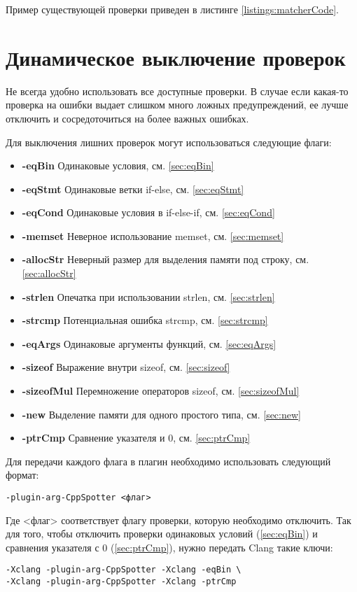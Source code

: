 Пример существующей проверки приведен в листинге \ref{listings:matcherCode}.

\section{Динамическое выключение проверок}
Не всегда удобно использовать все доступные проверки. В случае если какая-то проверка на ошибки
выдает слишком много ложных предупреждений, ее лучше отключить и сосредоточиться на более важных
ошибках. 

Для выключения лишних проверок могут использоваться следующие флаги:
\begin{itemize}
	\item \textbf{-eqBin}	Одинаковые условия, см. \ref{sec:eqBin}
	\item \textbf{-eqStmt}	Одинаковые ветки if-else, см. \ref{sec:eqStmt}
	\item \textbf{-eqCond}	Одинаковые условия в if-else-if, см. \ref{sec:eqCond}
	\item \textbf{-memset}	Неверное использование memset, см. \ref{sec:memset}
	\item \textbf{-allocStr}	Неверный размер для выделения памяти под строку, см. \ref{sec:allocStr}
	\item \textbf{-strlen}	Опечатка при использовании strlen, см. \ref{sec:strlen}
	\item \textbf{-strcmp}	Потенциальная ошибка strcmp, см. \ref{sec:strcmp}
	\item \textbf{-eqArgs}	Одинаковые аргументы функций, см. \ref{sec:eqArgs}
	\item \textbf{-sizeof}	Выражение внутри sizeof, см. \ref{sec:sizeof}
	\item \textbf{-sizeofMul}	Перемножение операторов sizeof, см. \ref{sec:sizeofMul}
	\item \textbf{-new}		Выделение памяти для одного простого типа, см. \ref{sec:new}
	\item \textbf{-ptrCmp}	Сравнение указателя и 0, см. \ref{sec:ptrCmp}
\end{itemize}

Для передачи каждого флага в плагин необходимо использовать следующий формат:
\begin{lstlisting}
-plugin-arg-CppSpotter <флаг> 
\end{lstlisting}
Где <флаг> соответствует флагу проверки, которую необходимо отключить.
Так для того, чтобы отключить проверки одинаковых условий (\ref{sec:eqBin}) и сравнения указателя с 0 (\ref{sec:ptrCmp}),
нужно передать Clang такие ключи:
\begin{lstlisting}
-Xclang -plugin-arg-CppSpotter -Xclang -eqBin \ 
-Xclang -plugin-arg-CppSpotter -Xclang -ptrCmp  
\end{lstlisting}

